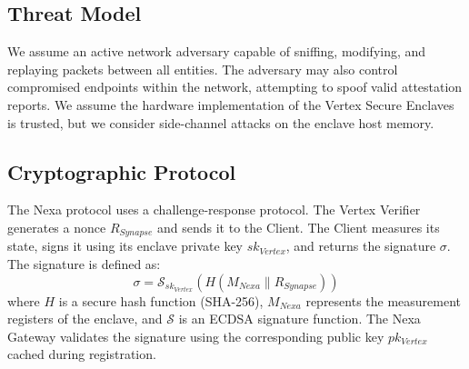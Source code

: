 \subsection{Threat Model}
We assume an active network adversary capable of sniffing, modifying, and replaying packets between all entities. The adversary may also control compromised endpoints within the network, attempting to spoof valid attestation reports. We assume the hardware implementation of the Vertex Secure Enclaves is trusted, but we consider side-channel attacks on the enclave host memory.

\subsection{Cryptographic Protocol}
The Nexa protocol uses a challenge-response protocol. The Vertex Verifier generates a nonce $R_{Synapse}$ and sends it to the Client. The Client measures its state, signs it using its enclave private key $sk_{Vertex}$, and returns the signature $\sigma$. The signature is defined as:
\begin{equation}
    \sigma = \mathcal{S}_{sk_{Vertex}} \left( H \left( M_{Nexa} \mathbin{\parallel} R_{Synapse} \right) \right)
\end{equation}
where $H$ is a secure hash function (SHA-256), $M_{Nexa}$ represents the measurement registers of the enclave, and $\mathcal{S}$ is an ECDSA signature function. The Nexa Gateway validates the signature using the corresponding public key $pk_{Vertex}$ cached during registration.
